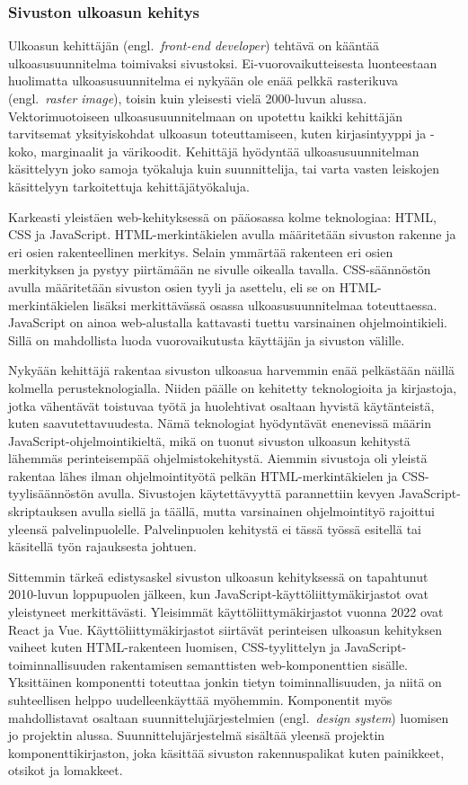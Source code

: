 \documentclass[finnish, 12pt, a4paper, elec, utf8, a-1b, online]{aaltothesis}
\begin{document}
\subsubsection{Sivuston ulkoasun kehitys}

Ulkoasun kehittäjän (engl.~\textit{front-end developer}) tehtävä on kääntää
ulkoasusuunnitelma toimivaksi sivustoksi. Ei-vuorovaikutteisesta luonteestaan
huolimatta ulkoasusuunnitelma ei nykyään ole enää pelkkä rasterikuva
(engl.~\textit{raster image}), toisin kuin yleisesti vielä 2000-luvun alussa.
Vektorimuotoiseen ulkoasusuunnitelmaan on upotettu kaikki kehittäjän tarvitsemat
yksityiskohdat ulkoasun toteuttamiseen, kuten kirjasintyyppi ja -koko,
marginaalit ja värikoodit. Kehittäjä hyödyntää ulkoasusuunnitelman käsittelyyn
joko samoja työkaluja kuin suunnittelija, tai varta vasten leiskojen käsittelyyn
tarkoitettuja kehittäjätyökaluja.

Karkeasti yleistäen web-kehityksessä on pääosassa kolme teknologiaa: HTML, CSS
ja JavaScript. HTML-merkintäkielen avulla määritetään sivuston rakenne ja eri
osien rakenteellinen merkitys. Selain ymmärtää rakenteen eri osien merkityksen
ja pystyy piirtämään ne sivulle oikealla tavalla. CSS-säännöstön avulla
määritetään sivuston osien tyyli ja asettelu, eli se on HTML-merkintäkielen
lisäksi merkittävässä osassa ulkoasusuunnitelmaa toteuttaessa. JavaScript on
ainoa web-alustalla kattavasti tuettu varsinainen ohjelmointikieli. Sillä on
mahdollista luoda vuorovaikutusta käyttäjän ja sivuston välille.

Nykyään kehittäjä rakentaa sivuston ulkoasua harvemmin enää pelkästään näillä
kolmella perusteknologialla. Niiden päälle on kehitetty teknologioita ja
kirjastoja, jotka vähentävät toistuvaa työtä ja huolehtivat osaltaan hyvistä
käytänteistä, kuten saavutettavuudesta. Nämä teknologiat hyödyntävät enenevissä
määrin JavaScript-ohjelmointikieltä, mikä on tuonut sivuston ulkoasun kehitystä
lähemmäs perinteisempää ohjelmistokehitystä. Aiemmin sivustoja oli yleistä
rakentaa lähes ilman ohjelmointityötä pelkän HTML-merkintäkielen ja
CSS-tyylisäännöstön avulla. Sivustojen käytettävyyttä parannettiin kevyen
JavaScript-skriptauksen avulla siellä ja täällä, mutta varsinainen
ohjelmointityö rajoittui yleensä palvelinpuolelle. Palvelinpuolen kehitystä ei
tässä työssä esitellä tai käsitellä työn rajauksesta johtuen.

Sittemmin tärkeä edistysaskel sivuston ulkoasun kehityksessä on tapahtunut
2010-luvun loppupuolen jälkeen, kun JavaScript-käyttöliittymäkirjastot ovat
yleistyneet merkittävästi. Yleisimmät käyttöliittymäkirjastot vuonna 2022 ovat
React ja Vue. Käyttöliittymäkirjastot siirtävät perinteisen ulkoasun kehityksen
vaiheet kuten HTML-rakenteen luomisen, CSS-tyylittelyn ja
JavaScript-toiminnallisuuden rakentamisen semanttisten web-komponenttien
sisälle. Yksittäinen komponentti toteuttaa jonkin tietyn toiminnallisuuden, ja
niitä on suhteellisen helppo uudelleenkäyttää myöhemmin. Komponentit myös
mahdollistavat osaltaan suunnittelujärjestelmien (engl.~\textit{design system})
luomisen jo projektin alussa. Suunnittelujärjestelmä sisältää yleensä projektin
komponenttikirjaston, joka käsittää sivuston rakennuspalikat kuten painikkeet,
otsikot ja lomakkeet.
\end{document}
